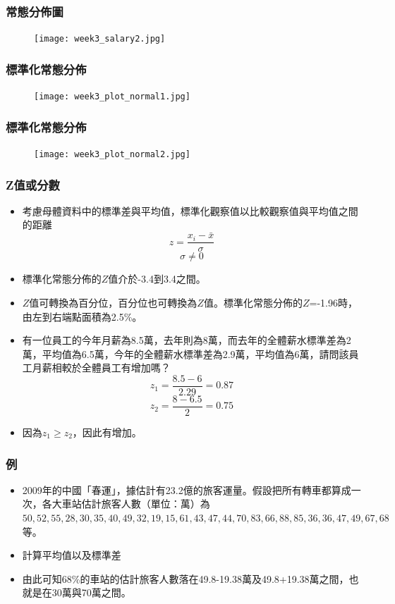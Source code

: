 \documentclass{beamer}
\begin{document}
\begin{frame}\frametitle{常態分佈圖}
\begin{figure}
\begin{center}
\texttt{[image: week3\_salary2.jpg]}
\end{center}
\end{figure}
\end{frame}

\begin{frame}\frametitle{標準化常態分佈}
\begin{figure}
\begin{center}
\texttt{[image: week3\_plot\_normal1.jpg]}
\end{center}
\end{figure}
\end{frame}
\begin{frame}\frametitle{標準化常態分佈}
\begin{figure}
\begin{center}
\texttt{[image: week3\_plot\_normal2.jpg]}
\end{center}
\end{figure}
\end{frame}
\begin{frame}\frametitle{Z值或分數}
\begin{itemize}
\item 考慮母體資料中的標準差與平均值，標準化觀察值以比較觀察值與平均值之間的距離
\[z=\frac{x_{i}-\bar{x}}{\sigma}\]
\[\sigma\neq 0\]
\item 標準化常態分佈的$Z$值介於-3.4到3.4之間。
\item $Z$值可轉換為百分位，百分位也可轉換為$Z$值。標準化常態分佈的$Z$=-1.96時，由左到右端點面積為2.5\%。
\item 有一位員工的今年月薪為8.5萬，去年則為8萬，而去年的全體薪水標準差為2萬，平均值為6.5萬，今年的全體薪水標準差為2.9萬，平均值為6萬，請問該員工月薪相較於全體員工有增加嗎？
\[z_{1}=\frac{8.5-6}{2.29}=0.87\]
\[z_{2}=\frac{8-6.5}{2}=0.75\]
\item 因為$z_{1}\geq z_{2}$，因此有增加。
\end{itemize} 
\end{frame}
\begin{frame}\frametitle{例}
\begin{itemize}
\item 2009年的中國「春運」，據估計有23.2億的旅客運量。假設把所有轉車都算成一次，各大車站估計旅客人數（單位：萬）為$50, 52, 55, 28, 30, 35, 40, 49, 32, 19, 15, 61, 43,47, 44, 70, 83, 66, 88, 85, 36, 36, 47, 49,67, 68$等。
\item 計算平均值以及標準差
\item 由此可知68\%的車站的估計旅客人數落在49.8-19.38萬及49.8+19.38萬之間，也就是在30萬與70萬之間。
\end{itemize} 
\end{frame}
\end{document}
